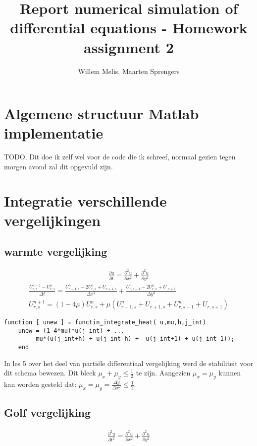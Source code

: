 \documentclass[11pt]{article} %
\title{Report numerical simulation of differential equations - Homework assignment 2}
\author{Willem Melis, Maarten Sprengers}
\begin{document}
\maketitle
\newpage
\tableofcontents
\newpage

\section{Algemene structuur Matlab implementatie}
TODO, Dit doe ik zelf wel voor de code die ik schreef, normaal gezien tegen morgen avond zal dit opgevuld zijn.
\section{Integratie verschillende vergelijkingen}

	\subsection{warmte vergelijking}
		\begin{eqnarray}
			\frac{\partial u}{\partial t} = 
			\frac{\partial ^2 u}{\partial x^2} + 
			\frac{\partial ^2 u}{\partial  y^2} 	
		\end{eqnarray}
		\begin{eqnarray}
			\frac{U_{r,s}^{n+1} - U_{r,s}^n}{\Delta t} =
			\frac{U_{r-1,s}^n - 2 U_{r,s}^n + U_{r+1,s}}{\Delta x^2} + 
			\frac{U_{r,s-1}^n - 2 U_{r,s}^n + U_{,s+1} }{\Delta y^2} \\
			U_{r,s}^{n+1} =( 1-4\mu )U_{r,s}^n + \mu (U_{r-1,s}^n  + U_{r+1,s} + 
			U_{r,s-1}^n  + U_{r,s+1})
		\end{eqnarray}

\begin{lstlisting}[caption=Code Explicit Euler,label={lst:expl_euler}]
function [ unew ] = functin_integrate_heat( u,mu,h,j_int)
	unew = (1-4*mu)*u(j_int) + ... 
	     mu*(u(j_int+h) + u(j_int-h) +  u(j_int+1) + u(j_int-1));
	end
\end{lstlisting}
		In les 5 over het deel van partiële differentiaal vergelijking werd de stabiliteit voor dit schema bewezen. Dit bleek $\mu_x + \mu_y \leq \frac{1}{2}$ te zijn. Aangezien $\mu_x = \mu_y$ kunnen kan worden gesteld dat: $\mu_x=\mu_y=\frac{\Delta y}{\Delta x^2} \leq \frac{1}{2}$.
	\subsection{Golf vergelijking}
		\begin{eqnarray}
		\frac{\partial^2 u}{\partial t^2} = 
		\frac{\partial ^2 u}{\partial x^2} + 
		\frac{\partial ^2 u}{\partial  y^2} 	
		\end{eqnarray}
\end{document}
